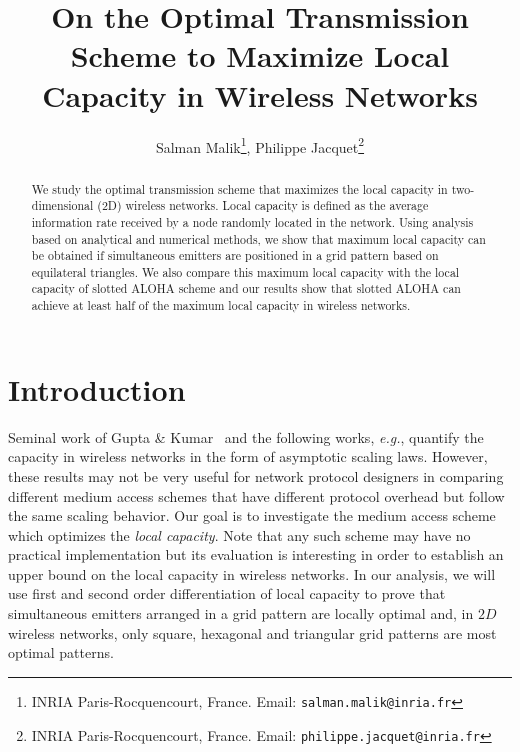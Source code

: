 \documentclass[12pt,english]{article}
\begin{document}
\def\ss{\sigma}
\def\fpzi{\frac{\partial}{\partial z_i}}
\def\fpzj{\frac{\partial}{\partial z_j}}
\def\BM{{\bf M}}
\def\BI{{\bf I}}
\def\BA{{\bf A}}
\def\BB{{\bf B}}
\def\E{{\bf E}}
\def\BD{{\bf D}}
\def\BT{{\bf T}}
\def\BX{{\bf X}}
\def\BU{{\bf U}}
\def\Bu{{\bf u}}
\def\BV{{\bf V}}
\def\Bv{{\bf v}}
\def\BI{\hbox{I}}
\def\BJ{\hbox{J}}
\def\det{\hbox{\rm det}}
\def\tr{\hbox{\rm tr}}
\def\fpx{\frac{\partial}{\partial x}}
\def\fpy{\frac{\partial}{\partial y}}
\def\det{\hbox{\rm det}}

\title{On the Optimal Transmission Scheme to Maximize Local Capacity in Wireless Networks}

\author{
Salman Malik\footnote{INRIA Paris-Rocquencourt, France. Email: \texttt{salman.malik@inria.fr}}, 
Philippe Jacquet\footnote{INRIA Paris-Rocquencourt, France. Email: \texttt{philippe.jacquet@inria.fr}}
}
\date{}

\maketitle

\begin{abstract}

We study the optimal transmission scheme that maximizes the local capacity in two-dimensional (2D) wireless networks. Local capacity is defined as the average information rate received by a node randomly located in the network. Using analysis based on analytical and numerical methods, we show that maximum local capacity can be obtained if simultaneous emitters are positioned in a grid pattern based on equilateral triangles. We also compare this maximum local capacity with the local capacity of slotted ALOHA scheme and our results show that slotted ALOHA can achieve at least half of the maximum local capacity in wireless networks.

\end{abstract}

\section{Introduction}
\label{sec:intro}

Seminal work of Gupta \& Kumar~\cite{Gupta:Kumar} and the following works, {\it e.g.}, \cite{scaling,scaling2} quantify the capacity in wireless networks in the form of asymptotic scaling laws. However, these results may not be very useful for network protocol designers in comparing different medium access schemes that have different protocol overhead but follow the same scaling behavior. Our goal is to investigate the medium access scheme which optimizes the {\em local capacity}. Note that any such scheme may have no practical implementation but its evaluation is interesting in order to establish an upper bound on the local capacity in wireless networks. In our analysis, we will use first and second order differentiation of local capacity to prove that simultaneous emitters arranged in a grid pattern are locally optimal and, in $2D$ wireless networks, only square, hexagonal and triangular grid patterns are most optimal patterns.  
\end{document}
